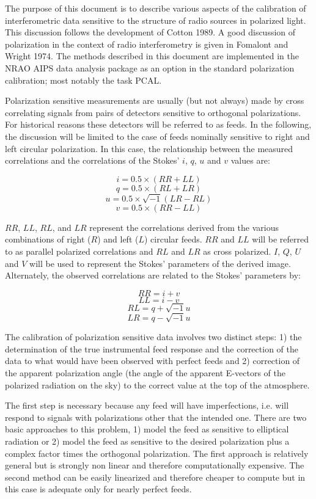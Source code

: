    The purpose of this document is to describe various aspects of the
calibration of interferometric data sensitive to the structure of
radio sources in polarized light.  This discussion follows the
development of Cotton 1989. A good discussion of polarization in the
context of radio interferometry is given in Fomalont and Wright 1974.
The methods described in this document are implemented in the NRAO
AIPS data analysis package as an option in the standard polarization
calibration; most notably the task PCAL.

   Polarization sensitive measurements are usually (but not always)
made by cross correlating signals from pairs of detectors sensitive to
orthogonal polarizations.  For historical reasons these detectors will
be referred to as feeds.  In the following, the discussion will be
limited to the case of feeds nominally sensitive to right and left
circular polarization.  In this case, the relationship between the
measured correlations and the correlations of the Stokes' $i$, $q$,
$u$ and $v$ values are:

$$ i = 0.5 \times (RR + LL) $$
$$ q = 0.5 \times (RL + LR) $$
$$ u = 0.5 \times \sqrt{-1}(LR - RL)$$
$$ v = 0.5 \times (RR - LL) $$

$RR$, $LL$, $RL$, and $LR$ represent the correlations derived from the
various combinations of right ($R$) and left ($L$) circular feeds.
$RR$ and $LL$ will be referred to as parallel polarized correlations
and $RL$ and $LR$ as cross polarized.  $I$, $Q$, $U$ and $V$ will be
used to represent the Stokes' parameters of the derived image.
Alternately, the observed correlations are related to the Stokes'
parameters by:

$$ RR = i + v $$ $$ LL = i - v $$ $$ RL = q + \sqrt{-1} u $$ $$ LR = q
- \sqrt{-1} u $$

   The calibration of polarization sensitive data involves two
distinct steps: 1) the determination of the true instrumental feed
response and the correction of the data to what would have been
observed with perfect feeds and 2) correction of the apparent
polarization angle (the angle of the apparent E-vectors of the
polarized radiation on the sky) to the correct value at the top of the
atmosphere.

   The first step is necessary because any feed will have
imperfections, i.e. will respond to signals with polarizations other
that the intended one.  There are two basic approaches to this
problem, 1) model the feed as sensitive to elliptical radiation or 2)
model the feed as sensitive to the desired polarization plus a complex
factor times the orthogonal polarization.  The first approach is
relatively general but is strongly non linear and therefore
computationally expensive. The second method can be easily linearized
and therefore cheaper to compute but in this case is adequate only for
nearly perfect feeds.

